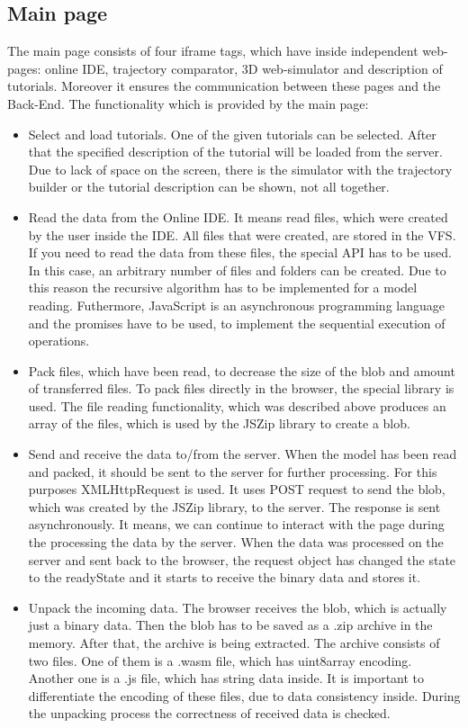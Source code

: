 \subsection{Main page}
The main page consists of four iframe tags, which have inside independent web-pages: online IDE, trajectory comparator, 3D web-simulator and description of tutorials. Moreover it ensures the communication between these pages and the Back-End. The functionality which is provided by the main page:
\begin{itemize}
    \item Select and load tutorials. One of the given tutorials can be selected. After that the specified description of the tutorial will be loaded from the server. Due to lack of space on the screen, there is the simulator with the trajectory builder or the tutorial description can be shown, not all together.
    \item Read the data from the Online IDE. It means read files, which were created by the user inside the IDE. All files that were created, are stored in the VFS. If you need to read the data from these files, the special API\cite{FilesystemAPI} has to be used. In this case, an arbitrary number of files and folders can be created. Due to this reason the recursive algorithm has to be implemented for a model reading. Futhermore, JavaScript is an asynchronous programming language and the promises\cite{JSPromise} have to be used, to implement the sequential execution of operations.
    \item Pack files, which have been read, to decrease the size of the blob and amount of transferred files. To pack files directly in the browser, the special library is used. The file reading functionality, which was described above produces an array of the files, which is used by the JSZip library\cite{JSZip} to create a blob.
    \item Send and receive the data to/from the server. When the model has been read and packed, it should be sent to the server for further processing. For this purposes XMLHttpRequest \cite{XMLHttpRequest} is used. It uses POST request to send the blob, which was created by the JSZip library, to the server. The response is sent asynchronously. It means, we can continue to interact with the page during the processing the data by the server. When the data was processed on the server and sent back to the browser, the request object has changed the state to the readyState and it starts to receive the binary data and stores it.
    \item Unpack the incoming data. The browser receives the blob, which is actually just a binary data. Then the blob has to be saved as a .zip archive in the memory. After that, the archive is being extracted. The archive consists of two files. One of them is a .wasm file, which has uint8array encoding. Another one is a .js file, which has string data inside. It is important to differentiate the encoding of these files, due to data consistency inside. During the unpacking process the correctness of received data is checked.

\end{itemize}
